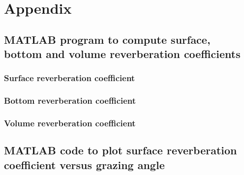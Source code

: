 \chapter*{Appendix}

\section{ MATLAB program to compute surface, bottom and volume reverberation coefficients } \label{ MATLAB program to compute surface, bottom and volume reverberation coefficients } 
\subsection{ Surface reverberation coefficient } \label{ Surface reverberation coefficient } 


\subsection{ Bottom reverberation coefficient } \label{ Bottom reverberation coefficient } 


\subsection{ Volume reverberation coefficient } \label{ Volume reverberation coefficient } 


\newpage

\section{ MATLAB code to plot surface reverberation coefficient versus grazing angle } \label{ MATLAB code to plot Surface reverberation coefficient versus grazing angle }


